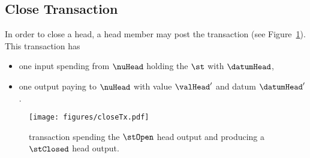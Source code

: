 \subsection{Close Transaction}\label{sec:close-tx}

In order to close a head, a head member may post the \mtxClose{} transaction
(see Figure~\ref{fig:closeTx}). This transaction has
\begin{itemize}
	\item one input spending from $\nuHead$ holding the $\st$ with $\datumHead$,
	\item one output paying to $\nuHead$ with value $\valHead'$ and
	      datum $\datumHead'$.
\end{itemize}

\begin{figure}[h]
	\centering
	\texttt{[image: figures/closeTx.pdf]}
	\caption{\mtxClose{} transaction spending the $\stOpen$ head output and producing a $\stClosed$ head output.}\label{fig:closeTx}
\end{figure}

